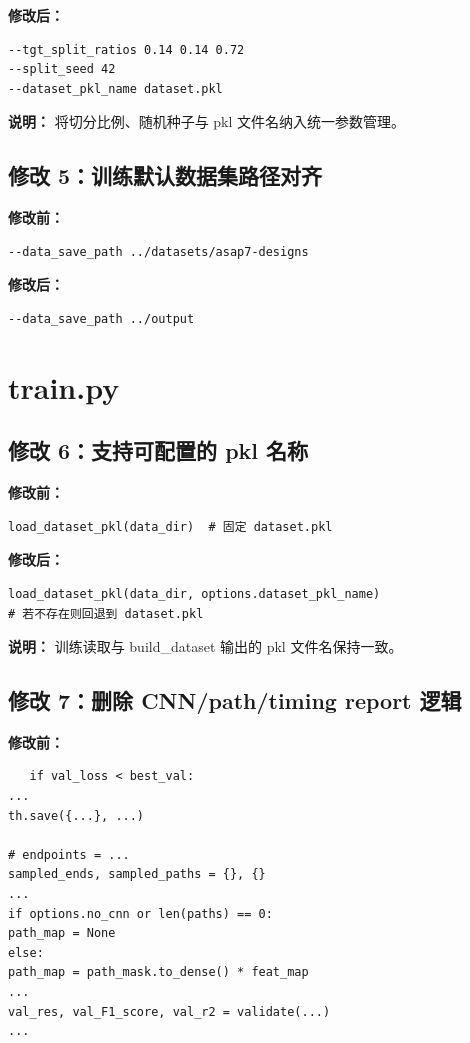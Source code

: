 \documentclass[11pt]{article}
\begin{document}
\textbf{修改后：}
\begin{lstlisting}
--tgt_split_ratios 0.14 0.14 0.72
--split_seed 42
--dataset_pkl_name dataset.pkl
\end{lstlisting}

\textbf{说明：} 将切分比例、随机种子与 pkl 文件名纳入统一参数管理。

\subsection*{修改 5：训练默认数据集路径对齐}
\textbf{修改前：}
\begin{lstlisting}
--data_save_path ../datasets/asap7-designs
\end{lstlisting}

\textbf{修改后：}
\begin{lstlisting}
--data_save_path ../output
\end{lstlisting}


\section{train.py}
\subsection*{修改 6：支持可配置的 pkl 名称}
\textbf{修改前：}
\begin{lstlisting}
load_dataset_pkl(data_dir)  # 固定 dataset.pkl
\end{lstlisting}

\textbf{修改后：}
\begin{lstlisting}
load_dataset_pkl(data_dir, options.dataset_pkl_name)
# 若不存在则回退到 dataset.pkl
\end{lstlisting}

\textbf{说明：} 训练读取与 build\_dataset 输出的 pkl 文件名保持一致。

\subsection*{修改 7：删除 CNN/path/timing report 逻辑}
\textbf{修改前：}
\begin{lstlisting}
   if val_loss < best_val:
...
th.save({...}, ...)

# endpoints = ...
sampled_ends, sampled_paths = {}, {}
...
if options.no_cnn or len(paths) == 0:
path_map = None
else:
path_map = path_mask.to_dense() * feat_map
...
val_res, val_F1_score, val_r2 = validate(...)
...
\end{lstlisting}
\end{document}
